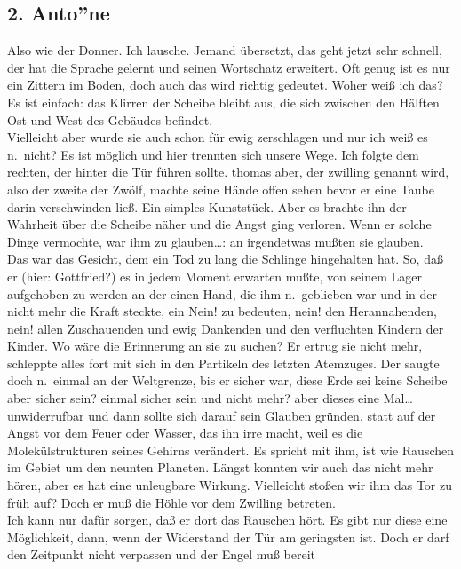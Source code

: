 \documentclass[
]{article}
\author{}
\date{\vspace{-2.5em}}
\begin{document}
\subsection{2. Anto''ne}\label{antone}

Also wie der Donner. Ich lausche. Jemand übersetzt, das geht jetzt sehr
schnell, der hat die Sprache gelernt und seinen Wortschatz erweitert.
Oft genug ist es nur ein Zittern im Boden, doch auch das wird richtig
gedeutet. Woher weiß ich das? Es ist einfach: das Klirren der Scheibe
bleibt aus, die sich zwischen den Hälften Ost und West des Gebäudes
befindet.\\
Vielleicht aber wurde sie auch schon für ewig zerschlagen und nur ich
weiß es n.~nicht? Es ist möglich und hier trennten sich unsere Wege. Ich
folgte dem rechten, der hinter die Tür führen sollte. thomas aber, der
zwilling genannt wird, also der zweite der Zwölf, machte seine Hände
offen sehen bevor er eine Taube darin verschwinden ließ. Ein simples
Kunststück. Aber es brachte ihn der Wahrheit über die Scheibe näher und
die Angst ging verloren. Wenn er solche Dinge vermochte, war ihm zu
glauben\ldots: an irgendetwas mußten sie glauben.\\
Das war das Gesicht, dem ein Tod zu lang die Schlinge hingehalten hat.
So, daß er (hier: Gottfried?) es in jedem Moment erwarten mußte, von
seinem Lager aufgehoben zu werden an der einen Hand, die ihm
n.~geblieben war und in der nicht mehr die Kraft steckte, ein Nein! zu
bedeuten, nein! den Herannahenden, nein! allen Zuschauenden und ewig
Dankenden und den verfluchten Kindern der Kinder. Wo wäre die Erinnerung
an sie zu suchen? Er ertrug sie nicht mehr, schleppte alles fort mit
sich in den Partikeln des letzten Atemzuges. Der saugte doch n.~einmal
an der Weltgrenze, bis er sicher war, diese Erde sei keine Scheibe aber
sicher sein? einmal sicher sein und nicht mehr? aber dieses eine
Mal\ldots{} unwiderrufbar und dann sollte sich darauf sein Glauben
gründen, statt auf der Angst vor dem Feuer oder Wasser, das ihn irre
macht, weil es die Molekülstrukturen seines Gehirns verändert. Es
spricht mit ihm, ist wie Rauschen im Gebiet um den neunten Planeten.
Längst konnten wir auch das nicht mehr hören, aber es hat eine
unleugbare Wirkung. Vielleicht stoßen wir ihm das Tor zu früh auf? Doch
er muß die Höhle vor dem Zwilling betreten.\\
Ich kann nur dafür sorgen, daß er dort das Rauschen hört. Es gibt nur
diese eine Möglichkeit, dann, wenn der Widerstand der Tür am geringsten
ist. Doch er darf den Zeitpunkt nicht verpassen und der Engel muß bereit
\end{document}
